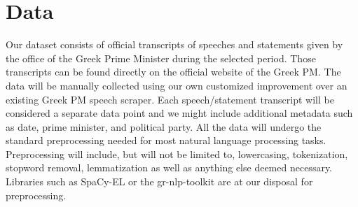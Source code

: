 \section{Data}
\label{sec:data}

Our dataset consists of official transcripts of speeches and statements given by the office of the Greek Prime Minister during the selected period. Those transcripts can be found directly on the official website of the Greek PM\cite{pm_website}. The data will be manually collected using our own customized improvement over an existing Greek PM speech scraper\cite{pm_scraper}. Each speech/statement transcript will be considered a separate data point and we might include additional metadata such as date, prime minister, and political party. All the data will undergo the standard preprocessing needed for most natural language processing tasks. Preprocessing will include, but will not be limited to, lowercasing, tokenization, stopword removal, lemmatization as well as anything else deemed necessary. Libraries such as SpaCy-EL\cite{spacy} or the gr-nlp-toolkit\cite{gr_nlp} are at our disposal for preprocessing.
